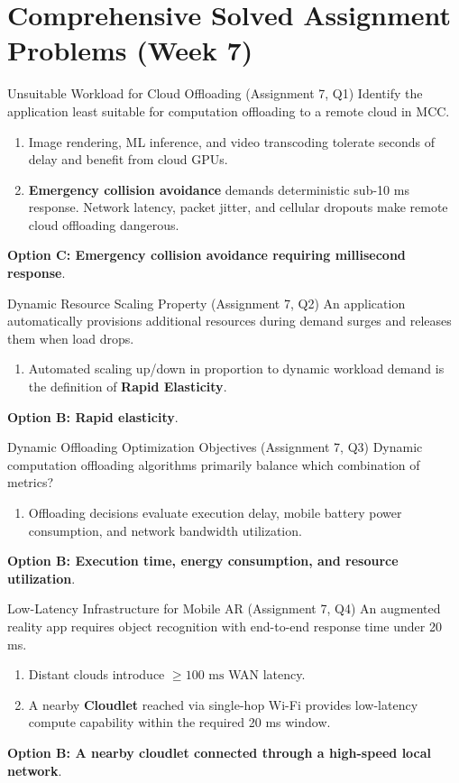 \section{Comprehensive Solved Assignment Problems (Week 7)}

\begin{solved}{Unsuitable Workload for Cloud Offloading (Assignment 7, Q1)}
\Given Identify the application least suitable for computation offloading to a remote cloud in MCC.
\Steps
\begin{enumerate}[leftmargin=*]
  \item Image rendering, ML inference, and video transcoding tolerate seconds of delay and benefit from cloud GPUs.
  \item \textbf{Emergency collision avoidance} demands deterministic sub-10 ms response. Network latency, packet jitter, and cellular dropouts make remote cloud offloading dangerous.
\end{enumerate}
\Answer \textbf{Option C: Emergency collision avoidance requiring millisecond response}.
\end{solved}

\begin{solved}{Dynamic Resource Scaling Property (Assignment 7, Q2)}
\Given An application automatically provisions additional resources during demand surges and releases them when load drops.
\Steps
\begin{enumerate}[leftmargin=*]
  \item Automated scaling up/down in proportion to dynamic workload demand is the definition of \textbf{Rapid Elasticity}.
\end{enumerate}
\Answer \textbf{Option B: Rapid elasticity}.
\end{solved}

\begin{solved}{Dynamic Offloading Optimization Objectives (Assignment 7, Q3)}
\Given Dynamic computation offloading algorithms primarily balance which combination of metrics?
\Steps
\begin{enumerate}[leftmargin=*]
  \item Offloading decisions evaluate execution delay, mobile battery power consumption, and network bandwidth utilization.
\end{enumerate}
\Answer \textbf{Option B: Execution time, energy consumption, and resource utilization}.
\end{solved}

\begin{solved}{Low-Latency Infrastructure for Mobile AR (Assignment 7, Q4)}
\Given An augmented reality app requires object recognition with end-to-end response time under 20 ms.
\Steps
\begin{enumerate}[leftmargin=*]
  \item Distant clouds introduce $\ge 100\text{ ms}$ WAN latency.
  \item A nearby \textbf{Cloudlet} reached via single-hop Wi-Fi provides low-latency compute capability within the required 20 ms window.
\end{enumerate}
\Answer \textbf{Option B: A nearby cloudlet connected through a high-speed local network}.
\end{solved}

